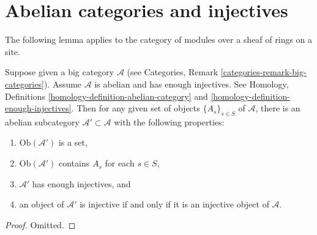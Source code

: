 \section{Abelian categories and injectives}
\label{section-abelian-categories-injectives}

\noindent
The following lemma applies to the category of modules over a sheaf
of rings on a site.

\begin{lemma}
\label{lemma-abelian-injectives}
Suppose given a big category $\mathcal{A}$ (see
Categories, Remark \ref{categories-remark-big-categories}).
Assume $\mathcal{A}$ is abelian and has enough injectives.
See Homology, Definitions \ref{homology-definition-abelian-category}
and \ref{homology-definition-enough-injectives}.
Then for any given set of objects $\{A_s\}_{s\in S}$
of $\mathcal{A}$, there is an abelian subcategory
$\mathcal{A}' \subset \mathcal{A}$
with the following properties:
\begin{enumerate}
\item $\text{Ob}(\mathcal{A}')$ is a set,
\item $\text{Ob}(\mathcal{A}')$ contains $A_s$ for each $s \in S$,
\item $\mathcal{A}'$ has enough injectives, and
\item an object of $\mathcal{A}'$ is injective if and only if it
is an injective object of $\mathcal{A}$.
\end{enumerate}
\end{lemma}

\begin{proof}
Omitted.
\end{proof}















